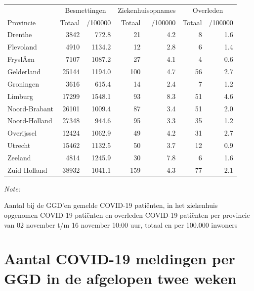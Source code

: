 \documentclass[
  english,
  man,floatsintext]{apa6}
\begin{document}
\begin{table}
\centering
\begin{threeparttable}
\begin{tabular}{lrrrrrr}
\toprule
\multicolumn{1}{c}{ } & \multicolumn{2}{c}{Besmettingen} & \multicolumn{2}{c}{Ziekenhuisopnames} & \multicolumn{2}{c}{Overleden} \\
\cmidrule(l{3pt}r{3pt}){2-3} \cmidrule(l{3pt}r{3pt}){4-5} \cmidrule(l{3pt}r{3pt}){6-7}
Provincie & Totaal & /100000 & Totaal & /100000 & Totaal & /100000\\
\midrule
Drenthe & 3842 & 772.8 & 21 & 4.2 & 8 & 1.6\\
Flevoland & 4910 & 1134.2 & 12 & 2.8 & 6 & 1.4\\
FryslÃ¢n & 7107 & 1087.2 & 27 & 4.1 & 4 & 0.6\\
Gelderland & 25144 & 1194.0 & 100 & 4.7 & 56 & 2.7\\
Groningen & 3616 & 615.4 & 14 & 2.4 & 7 & 1.2\\
Limburg & 17299 & 1548.1 & 93 & 8.3 & 51 & 4.6\\
Noord-Brabant & 26101 & 1009.4 & 87 & 3.4 & 51 & 2.0\\
Noord-Holland & 27348 & 944.6 & 95 & 3.3 & 35 & 1.2\\
Overijssel & 12424 & 1062.9 & 49 & 4.2 & 31 & 2.7\\
Utrecht & 15462 & 1132.5 & 50 & 3.7 & 12 & 0.9\\
Zeeland & 4814 & 1245.9 & 30 & 7.8 & 6 & 1.6\\
Zuid-Holland & 38932 & 1041.1 & 159 & 4.3 & 77 & 2.1\\
\bottomrule
\end{tabular}
\begin{tablenotes}
\item \textit{Note: } 
\item Aantal bij de GGD’en gemelde COVID-19 patiënten, in het ziekenhuis opgenomen COVID-19 patiënten en overleden COVID-19 patiënten per provincie van 02 november t/m 16 november 10:00 uur, totaal en per 100.000 inwoners
\end{tablenotes}
\end{threeparttable}
\end{table}

\newpage

\hypertarget{aantal-covid-19-meldingen-per-ggd-in-de-afgelopen-twee-weken}{%
\section{Aantal COVID-19 meldingen per GGD in de afgelopen twee weken}\label{aantal-covid-19-meldingen-per-ggd-in-de-afgelopen-twee-weken}}
\end{document}
